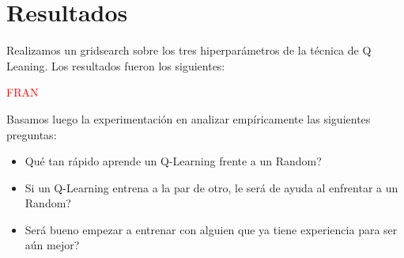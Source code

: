 \section{Resultados}

Realizamos un gridsearch sobre los tres hiperpar\'ametros de la t\'ecnica de Q Leaning. Los resultados fueron los siguientes:

\textcolor{red}{FRAN}

Basamos luego la experimentaci\'on en analizar emp\'iricamente las siguientes preguntas:

\begin{itemize}
  \item Qu\'e tan r\'apido aprende un Q-Learning frente a un Random?
  \item Si un Q-Learning entrena a la par de otro, le ser\'a de ayuda al enfrentar a un Random?
  \item Ser\'a bueno empezar a entrenar con alguien que ya tiene experiencia para ser a\'un mejor?
\end{itemize}


\newpage

\newpage

